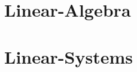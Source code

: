 \documentclass{beamer}
\begin{document}
\newcommand{\vecThree}[3]{
  \left[
  \begin{array}{r}
    #1 \\  #2 \\ #3
  \end{array}
  \right]
}


\newcommand{\stateThree}[3]{
  \begin{array}{r}
    \mbox{\fontsize{6}{6}\selectfont $#1$} \\  
    \mbox{\fontsize{6}{6}\selectfont $#2$} \\ 
    \mbox{\fontsize{6}{6}\selectfont $#3$}
  \end{array}
}





\newcommand{\detTwo}[4]{
  \left|
  \begin{array}{rr}
    #1 & #2 \\
    #3 & #4
  \end{array}
  \right|
}



\newcommand{\detThree}[9]{
  \left|
    \begin{array}{rrr}
      #1 & #2 & #3 \\
      #4 & #5 & #6 \\
      #7 & #8 & #9
    \end{array}
  \right|
}




\newcommand{\startRowFour}{
  \left[
    \begin{array}{rrrr}
}

\newcommand{\oneRowFour}[4] {
      #1 & #2 & #3 & #4 \\
}




\part{Linear-Algebra}



\part{Linear-Systems}





\end{document}
